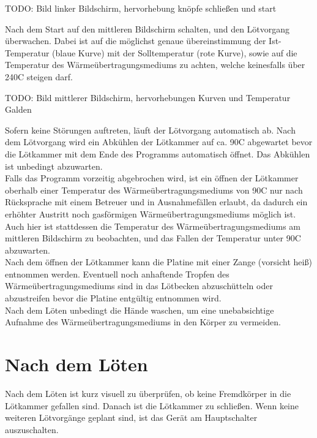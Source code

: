 \documentclass{\basedir/fablab-document}
\begin{document}
TODO: Bild linker Bildschirm, hervorhebung kn{\"o}pfe schlie{\ss}en und start

Nach dem Start auf den mittleren Bildschirm schalten, und den L{\"o}tvorgang {\"u}berwachen. Dabei ist auf die m{\"o}glichst genaue {\"u}bereinstimmung der Ist-Temperatur (blaue Kurve) mit der Solltemperatur (rote Kurve), sowie auf die Temperatur des W{\"a}rme{\"u}bertragungsmediums zu achten, welche keinesfalls {\"u}ber 240\textdegree C steigen darf. 

TODO: Bild mittlerer Bildschirm, hervorhebungen Kurven und Temperatur Galden

Sofern keine St{\"o}rungen auftreten, l{\"a}uft der L{\"o}tvorgang automatisch ab. Nach dem L{\"o}tvorgang wird ein Abk{\"u}hlen der L{\"o}tkammer auf ca. 90\textdegree C abgewartet bevor die L{\"o}tkammer mit dem Ende des Programms automatisch {\"o}ffnet. Das Abk{\"u}hlen ist unbedingt abzuwarten.\\

Falls das Programm vorzeitig abgebrochen wird, ist ein {\"o}ffnen der L{\"o}tkammer oberhalb einer Temperatur des W{\"a}rme{\"u}bertragungsmediums von 90\textdegree C nur nach R{\"u}cksprache mit einem Betreuer und in Ausnahmef{\"a}llen erlaubt, da dadurch ein erh{\"o}hter Austritt noch gasf{\"o}rmigen W{\"a}rme{\"u}bertragungsmediums m{\"o}glich ist. Auch hier ist stattdessen die Temperatur des W{\"a}rme{\"u}bertragungsmediums am mittleren Bildschirm zu beobachten, und das Fallen der Temperatur unter 90\textdegree C abzuwarten.\\

Nach dem {\"o}ffnen der L{\"o}tkammer kann die Platine mit einer Zange (vorsicht hei{\ss}) entnommen werden. Eventuell noch anhaftende Tropfen des W{\"a}rme{\"u}bertragungsmediums sind in das L{\"o}tbecken abzusch{\"u}tteln oder abzustreifen bevor die Platine entg{\"u}ltig entnommen wird.\\

Nach dem L{\"o}ten unbedingt die H{\"a}nde waschen, um eine unebabsichtige Aufnahme des W{\"a}rme{\"u}bertragungsmediums in den K{\"o}rper zu vermeiden.

\section{Nach dem L{\"o}ten}

Nach dem L{\"o}ten ist kurz visuell zu {\"u}berpr{\"u}fen, ob keine Fremdk{\"o}rper in die L{\"o}tkammer gefallen sind. Danach ist die L{\"o}tkammer zu schlie{\ss}en. Wenn keine weiteren L{\"o}tvorg{\"a}nge geplant sind, ist das Ger{\"a}t am Hauptschalter auszuschalten.
	\newpage
\end{document}
